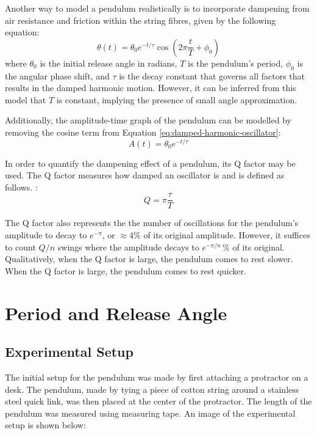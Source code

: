 \documentclass[12pt]{article}
\begin{document}
Another way to model a pendulum realistically is to incorporate dampening from air resistance and friction within the string fibres, given by the following equation:
\begin{equation} \label{eq:damped-harmonic-oscillator}
    \theta(t) = \theta_0 e^{-{t/\tau}} \cos\left(2\pi\frac{t}{T} + \phi_0\right)
\end{equation}
where $\theta_0$ is the initial release angle in radians, $T$ is the pendulum's period, $\phi_0$ is the angular phase shift, and $\tau$ is the decay constant that governs all factors that results in the damped harmonic motion. However, it can be inferred from this model that $T$ is constant, implying the presence of small angle approximation.

Additionally, the amplitude-time graph of the pendulum can be modelled by removing the cosine term from Equation \ref{eq:damped-harmonic-oscillator}:
\begin{equation} \label{eq:amplitude-function}
    A(t) = \theta_0 e^{-{t/\tau}}
\end{equation}

In order to quantify the dampening effect of a pendulum, its Q factor may be used. The Q factor measures how damped an oscillator is and is defined as follows. \cite{pnp-physics}:
\begin{equation} \label{eq:eq4}
    Q = \pi\frac{\tau}{T}
\end{equation}

The Q factor also represents the the number of oscillations for the pendulum's amplitude to decay to $e^{-\pi}$, or $\approx 4\%$ of its original amplitude. However, it suffices to count $Q/n$ swings where the amplitude decays to $e^{-\pi/n}\,\%$ of its original. Qualitatively, when the Q factor is large, the pendulum comes to rest slower. When the Q factor is large, the pendulum comes to rest quicker.

\section{Period and Release Angle}

\subsection{Experimental Setup}
The initial setup for the pendulum was made by first attaching a protractor on a desk. The pendulum, made by tying a piece of cotton string around a stainless steel quick link, was then placed at the center of the protractor. The length of the pendulum was measured using measuring tape. An image of the experimental setup is shown below:
\end{document}
